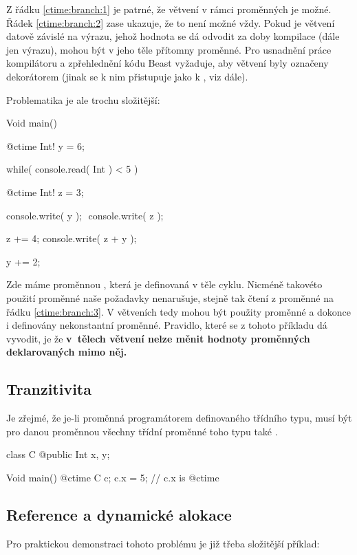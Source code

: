 Z řádku \ref{ctime:branch:1} je patrné, že větvení v rámci \ctime proměnných je možné. Řádek \ref{ctime:branch:2} zase ukazuje, že to není možné vždy. Pokud je větvení datově závislé na výrazu, jehož hodnota se dá odvodit za doby kompilace (dále jen \ctime výrazu), mohou být v jeho těle přítomny \ctime proměnné. Pro usnadnění práce kompilátoru a zpřehlednění kódu Beast vyžaduje, aby \ctime větvení byly označeny dekorátorem (jinak se k nim přistupuje jako k \nonctime, viz dále).

Problematika je ale trochu složitější:

\begin{code}
Void main() {
	@ctime Int! y = 6;

	while( console.read( Int ) < 5 ) {
		@ctime Int! z = 3;
				
		console.write( y );	$\label{ctime:branch:3}$
		console.write( z );
		
		z += 4;
		console.write( z + y );
		
		y += 2;
	}
}
\end{code}

Zde máme proměnnou , která je definovaná v těle \nonctime cyklu. Nicméně takovéto použití proměnné naše požadavky nenarušuje, stejně tak čtení z proměnné  na řádku \ref{ctime:branch:3}. V \nonctime větveních tedy mohou být použity \ctime proměnné a dokonce i definovány nekonstantní \ctime proměnné. Pravidlo, které se z tohoto příkladu dá vyvodit, je že \textbf{v~tělech \nonctime větvení nelze měnit hodnoty \ctime proměnných deklarovaných mimo něj.}

\subsection{Tranzitivita \ctime}
Je zřejmé, že je-li proměnná \ctime programátorem definovaného třídního typu, musí být pro danou proměnnou všechny třídní proměnné toho typu také \ctime.

\begin{code}
class C {
	@public Int x, y;
}

Void main() {
	@ctime C c;
	c.x = 5; // c.x is @ctime
}
\end{code}

\subsection{Reference a dynamické alokace} \label{ctime:ref}
Pro praktickou demonstraci tohoto problému je již třeba složitější příklad:

